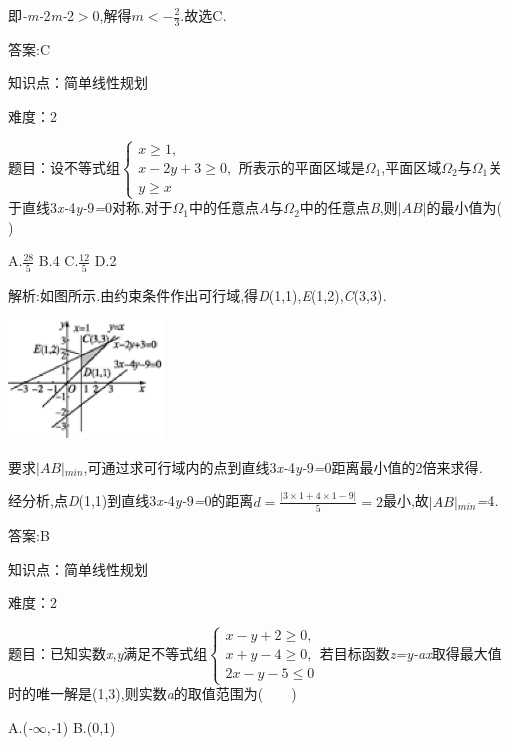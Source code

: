 \documentclass{article} %
\begin{document}
即\textit{-m-}2\textit{m-}2\textit{$>$}0,解得$m<-\frac{2}{3}$.故选C\textit{.}

 答案:C

知识点：简单线性规划

难度：2

题目：设不等式组$
\begin{cases}
x \ge 1,\\
x-2y+3 \ge0,\\
y \ge x
\end{cases}$所表示的平面区域是\textit{$\mathit{\Omega}$}${}_{1}$,平面区域\textit{$\mathit{\Omega}$}${}_{2}$与\textit{$\mathit{\Omega}$}${}_{1}$关于直线3\textit{x-}4\textit{y-}9\textit{=}0对称\textit{.}对于\textit{$\mathit{\Omega}$}${}_{1}$中的任意点\textit{A}与\textit{$\mathit{\Omega}$}${}_{2}$中的任意点\textit{B},则$|AB|$的最小值为(\textit{　　})

 A.$\frac{28}{5}$ B.4 C.$\frac{12}{5}$ D.2

 解析:如图所示\textit{.}由约束条件作出可行域,得\textit{D}(1,1),\textit{E}(1,2),\textit{C}(3,3)\textit{.}

 \includegraphics*[width=1.63in, height=1.25in, keepaspectratio=false]{image1653}

要求$|AB|$${}_{min}$,可通过求可行域内的点到直线3\textit{x-}4\textit{y-}9\textit{=}0距离最小值的2倍来求得\textit{.}

经分析,点\textit{D}(1,1)到直线3\textit{x-}4\textit{y-}9\textit{=}0的距离$d=\frac{|3\times1+4\times1-9|}{5}=2$最小,故$|AB|$${}_{min}$\textit{=}4\textit{.}

 答案:B

知识点：简单线性规划

难度：2

题目：已知实数\textit{x},\textit{y}满足不等式组$
\begin{cases}
x-y+2 \ge 0,\\
x+y-4\ge0,\\
2x-y-5 \le0
\end{cases}$若目标函数\textit{z=y-ax}取得最大值时的唯一解是(1,3),则实数\textit{a}的取值范围为(\textit{　　})

 A.(\textit{-$\infty$},\textit{-}1) B.(0,1)
\end{document}
